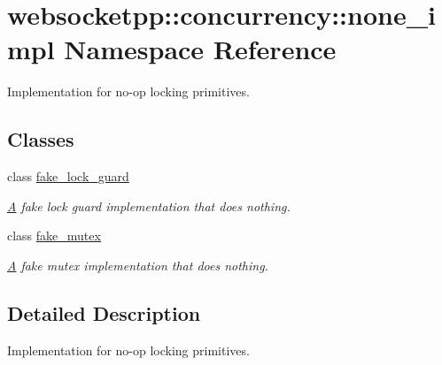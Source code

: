\hypertarget{namespacewebsocketpp_1_1concurrency_1_1none__impl}{}\section{websocketpp\+:\+:concurrency\+:\+:none\+\_\+impl Namespace Reference}
\label{namespacewebsocketpp_1_1concurrency_1_1none__impl}


Implementation for no-\/op locking primitives.  


\subsection*{Classes}
\begin{DoxyCompactItemize}
\item 
class \mbox{\hyperlink{classwebsocketpp_1_1concurrency_1_1none__impl_1_1fake__lock__guard}{fake\+\_\+lock\+\_\+guard}}
\begin{DoxyCompactList}\small\item\em \mbox{\hyperlink{struct_a}{A}} fake lock guard implementation that does nothing. \end{DoxyCompactList}\item 
class \mbox{\hyperlink{classwebsocketpp_1_1concurrency_1_1none__impl_1_1fake__mutex}{fake\+\_\+mutex}}
\begin{DoxyCompactList}\small\item\em \mbox{\hyperlink{struct_a}{A}} fake mutex implementation that does nothing. \end{DoxyCompactList}\end{DoxyCompactItemize}


\subsection{Detailed Description}
Implementation for no-\/op locking primitives. 